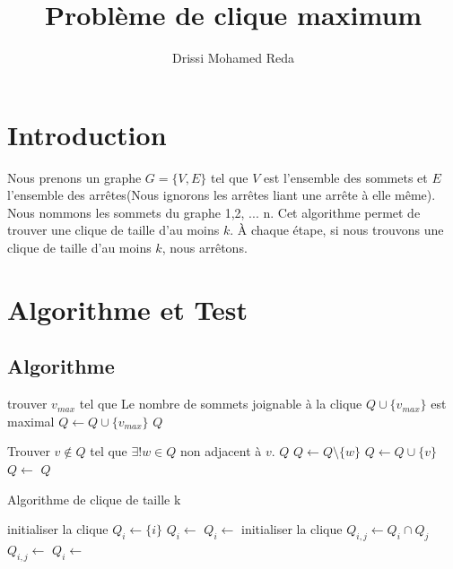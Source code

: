 \documentclass{article}
\title{Problème de clique maximum}
\author{Drissi Mohamed Reda}
\begin{document}
\maketitle
\newpage
\tableofcontents
\newpage
\section{Introduction}
Nous prenons un graphe $G=\{V,E\}$ tel que $V$ est l'ensemble des sommets
et $E$ l'ensemble des arrêtes(Nous ignorons les arrêtes liant une arrête à elle même). \\
Nous nommons les sommets du graphe 1,2, ... n. Cet algorithme permet de trouver une clique
de taille d'au moins $k$. À chaque étape, si nous trouvons une clique de taille d'au moins
$k$, nous arrêtons.
\section{Algorithme et Test}
\subsection{Algorithme}
\begin{algorithm}
\begin{algorithmic}
    \State trouver $v_{max}$ tel que Le nombre de sommets joignable à la clique $Q \cup \{v_{max}\}$ est maximal
    \State $Q \gets Q\cup \{v_{max}\}$
  \EndWhile
    \State \Return $Q$
  \EndFunction
\end{algorithmic}
\end{algorithm}
\begin{algorithm}
\begin{algorithmic}
  \State Trouver $v \notin Q$ tel que $\exists! w \in Q$ non adjacent à $v$.
      \State \Return $Q$
    \Else
      \State $Q\gets Q \setminus \{w\}$
      \State $Q \gets Q \cup \{v\}$
      \State $Q \gets$ 
      \State \Return $Q$
    \EndIf
  \EndFunction
\end{algorithmic}
\end{algorithm}

\begin{algorithm}[!htp]
\caption{Algorithme de clique de taille k}
\begin{algorithmic}[1]
    \State initialiser la clique $Q_i\gets \{i\}$
    \State $Q_i \gets$ 
      \State $Q_i \gets$ 
    \EndFor
  \EndFor
    \State initialiser la clique $Q_{i,j} \gets Q_i \cap Q_j$
    \State $Q_{i,j} \gets$ 
      \State $Q_i \gets$ 
    \EndFor
  \EndFor

\end{algorithmic}
\end{algorithm}
\end{document}
